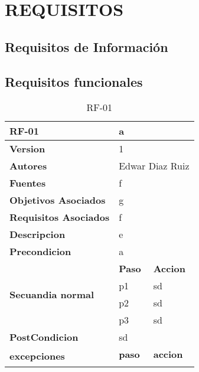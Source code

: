 \section{REQUISITOS}

\subsection{Requisitos de Información}
\subsection{Requisitos funcionales}

\begin{table}[H]
	\centering
	\caption{RF-01}
	\label{RF-01}
	\begin{tabular}{|l|l|l|}
		\hline
		\textbf{RF-01}                             & \multicolumn{2}{l|}{\textbf{a}}         \\ \hline
		\textbf{Version}                           & \multicolumn{2}{l|}{1}                  \\ \hline
		\textbf{Autores}                           & \multicolumn{2}{l|}{Edwar Diaz Ruiz}    \\ \hline
		\textbf{Fuentes}                           & \multicolumn{2}{l|}{f}                  \\ \hline
		\textbf{Objetivos Asociados}               & \multicolumn{2}{l|}{g}                  \\ \hline
		\textbf{Requisitos Asociados}              & \multicolumn{2}{l|}{f}                  \\ \hline
		\textbf{Descripcion}                       & \multicolumn{2}{l|}{e}                  \\ \hline
		\textbf{Precondicion}                      & \multicolumn{2}{l|}{a}                  \\ \hline
		\multirow{4}{*}{\textbf{Secuandia normal}} & \textbf{Paso} & \textbf{Accion}         \\ \cline{2-3} 
		& p1            & sd                      \\ \cline{2-3} 
		& p2            & sd                      \\ \cline{2-3} 
		& p3            & sd                      \\ \hline
		\textbf{PostCondicion}                     & \multicolumn{2}{l|}{sd}                 \\ \hline
		\multirow{3}{*}{\textbf{excepciones}}      & \textbf{paso} & \textbf{accion}         \\ \cline{2-3} 

\end{tabular}
\end{table}
